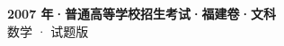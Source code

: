 \documentclass[zihao=-4, a4paper]{ctexart}
\begin{document}
\begin{center}
  {\Large\bfseries 2007 年·普通高等学校招生考试·福建卷·文科}\\[4pt]
  {\large 数学 · 试题版}
\end{center}
\medskip
{}

\end{document}
